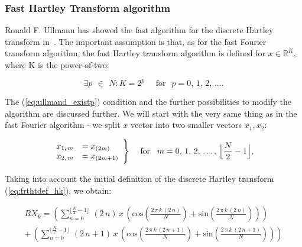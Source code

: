 \documentclass[12pt,twoside,a4paper]{article}
\numberwithin{equation}{subsection}
\numberwithin{figure}{subsection}
\begin{document}
\subsubsection*{Fast Hartley Transform algorithm}

Ronald F. Ullmann has showed the fast algorithm for the discrete Hartley transform in~\cite{ullmann_algorithm}. The important
assumption is that, as for the fast Fourier transform algorithm, the fast Hartley transform algorithm is defined for $x \in \mathbb{R} ^
K$, where K is the power-of-two:

\begin{equation} \label{eq:ullmand_existp}
  \exists p \, \ \in \ \, N : K = 2 ^ {p} \quad \mbox{ for } \ \, p = 0, \, 1, \, 2, \, \ldots  .
\end{equation}

The (\ref{eq:ullmand_existp}) condition and the further possibilities to modify the algorithm are discussed further. We will start with the
very same thing as in the fast Fourier algorithm - we split $x$ vector into two smaller vectors $x_1, x_2$:

\begin{subequations} \label{eq:hartley_smallervectors}
	\begin{equation}   \label{eq:hsvs_oddeven}
		\begin{array}{c l}      
			x_{1, \, m} &= x_{(2m)} \\
			x_{2, \, m} &= x_{(2m+1)} 
		\end{array}\Bigg\} 
		\quad \mbox{ for } \ \, m = 0, \, 1, \, 2, \, \ldots, \, \Big\lfloor \frac{N}{2} - 1 \Big\rfloor , \\
  \end{equation}
\end{subequations}

Taking into account the initial definition of the discrete Hartley transform (\ref{eq:frthtdef_hk}), we obtain:

\begin{multline}  \label{eq:hartley_longdht}
	RX_k = 
		\left( 
 			\sum_{n = 0}^{\lfloor \frac{N}{2} - 1 \rfloor } \, (2 \, n ) \, x \,  \left(
 				\mathrm{cos} \left( \frac {2 \, \pi \, k \, (2 \, n) }{N} \right) 
  	  	  	  + \mathrm{sin} \left( \frac {2 \, \pi \, k \, (2 \, n) }{N} \right) \right) 
        \right)  
\\ + \, \left( 
 			\sum_{n = 0}^{\lfloor \frac{N}{2} - 1 \rfloor } \, (2 \, n + 1) \, x \,  \left(
 				\mathrm{cos} \left( \frac {2 \, \pi \, k \, (2 \, n + 1)}{N} \right) 
 	  	      + \mathrm{sin} \left( \frac {2 \, \pi \, k \, (2 \, n + 1)}{N} \right) \right) 
 	  	\right)
\end{multline}
\end{document}
